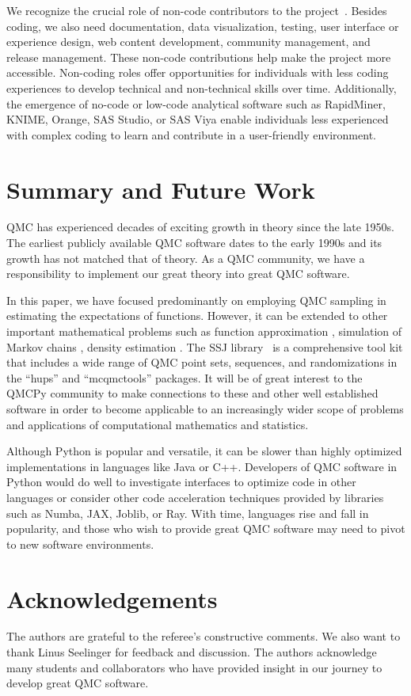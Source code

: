 \documentclass[graybox]{svmult}
\begin{document}
We recognize the crucial role of non-code contributors to the project~\cite{K23}. Besides coding, we also need documentation, data visualization, testing, user interface or experience design, web content development, community management, and release management. These non-code contributions help make the project more  accessible. Non-coding roles offer opportunities for individuals with less coding experiences to develop technical and non-technical skills over time.  Additionally, the emergence of no-code or low-code analytical software such as RapidMiner, KNIME, Orange, SAS Studio, or SAS Viya enable individuals less experienced with complex coding to learn and contribute in a user-friendly environment.


\section{Summary and Future Work}
QMC has experienced decades of exciting growth in theory since the late 1950s.  The earliest publicly available QMC software dates to the early 1990s and its growth has not matched that of theory.  As a QMC community, we have a responsibility to implement our great theory into great QMC software.

In this paper, we have focused predominantly on employing QMC sampling in estimating the expectations of functions. However, it can be extended to other important mathematical problems such as function approximation \cite{Kmmerer2015, PotSch21}, simulation of Markov chains \cite{l2018sorting,puchhammer2021variance},  density estimation \cite{LEcuyer2022b}.
The SSJ library~\cite{l2002ssj} is a comprehensive tool kit that includes a wide range of QMC point sets, sequences, and randomizations in the ``hups'' and ``mcqmctools'' packages. It will be of great interest to the QMCPy community to make connections to these and other well established software in order to become applicable to an increasingly wider scope of problems and applications of computational mathematics and statistics.

Although Python is popular and versatile, it can be slower than highly optimized implementations in languages like Java or C++.  Developers of QMC software in Python would do well to investigate interfaces to optimize code in other languages or consider other code acceleration techniques provided by libraries such as Numba, JAX, Joblib, or Ray.  With time, languages rise and fall in popularity, and those who wish to provide great QMC software may need to pivot to new software environments.


\section*{Acknowledgements}
The authors are grateful to the referee's constructive comments. We also want to thank Linus Seelinger for feedback and discussion. The authors acknowledge many students and collaborators who have provided insight in our journey to develop great QMC software.




\end{document}
